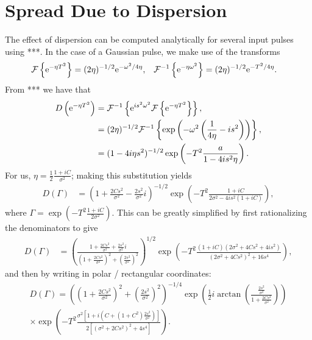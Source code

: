 
\chapter{Spread Due to Dispersion}
\label{chap:disp}

The effect of dispersion can be computed analytically for several input pulses using ***. In the case of a Gaussian pulse, we make use of the transforms \cite{integrals}
\begin{align*}
\mathcal{F}\left\{ \textrm{e}^{-\eta T^2} \right\} &= (2 \eta)^{-1/2}\textrm{e}^{-\omega^2/4\eta},& \mathcal{F}^{-1}\left\{ \textrm{e}^{-\eta \omega^2} \right\} &= (2 \eta)^{-1/2}\textrm{e}^{-T^2/4\eta}.
\end{align*}
From *** we have that
\begin{align*}
D \left( \textrm{e}^{-\eta T^2} \right) &=\mathcal{F}^{-1}\left\{ \textrm{e}^{i s^2 \omega^2} \mathcal{F}\left\{ \textrm{e}^{-\eta T^2} \right\} \right\}, \\
&= (2 \eta)^{-1/2} \mathcal{F}^{-1}\left\{ \exp \left( -\omega^2 \left( \frac{1}{4\eta} - i s^2 \right) \right) \right\}, \\
&= (1 - 4 i \eta s^2)^{-1/2} \exp \left( -T^2 \frac{a}{1 - 4 i s^2 \eta} \right).
\end{align*}
For us, $\displaystyle \eta = \frac{1}{2} \frac{1 + i C}{\sigma^2}$; making this substitution yields
\begin{align*}
D \left( \Gamma \right) &= \left( 1 + \frac{2C s^2}{\sigma^2} - \frac{2s^2}{\sigma^2}i \right)^{-1/2} \exp \left( -T^2 \frac{1 + i C}{2\sigma^2 - 4 i s^2 (1 + i C)} \right),
\end{align*}
where $\displaystyle \Gamma = \exp \left( -T^2 \frac{1 + iC}{2 \sigma^2} \right)$. This can be greatly simplified by first rationalizing the denominators to give
\begin{align*}
D \left( \Gamma \right) &= \left( \frac{1 + \frac{2C s^2}{\sigma^2} + \frac{2s^2}{\sigma^2}i}{\left( 1 + \frac{2C s^2}{\sigma^2} \right)^2 + \left( \frac{2s^2}{\sigma^2} \right)^2} \right)^{1/2} \exp \left( -T^2 \frac{(1 + i C)(2\sigma^2 + 4 C s^2 + 4 i s^2)}{(2\sigma^2 + 4C s^2)^2 + 16s^4} \right),
\end{align*}
and then by writing in polar / rectangular coordinates:
\begin{multline*}
D \left( \Gamma \right) = \left( \left( 1 + \frac{2C s^2}{\sigma^2} \right)^2 + \left( \frac{2s^2}{\sigma^2} \right)^2 \right)^{-1/4} \exp \left( \frac{1}{2} i \arctan \left( \frac{\frac{2s^2}{\sigma^2}}{1 + \frac{2C s^2}{\sigma^2}} \right) \right) \\
\times \exp \left( -T^2 \frac{\sigma^2 \left[ 1 + i \left( C + (1 + C^2) \frac{2s^2}{\sigma^2} \right) \right]}{2 \left[ (\sigma^2 + 2C s^2)^2 + 4s^4 \right]} \right).
\end{multline*}
